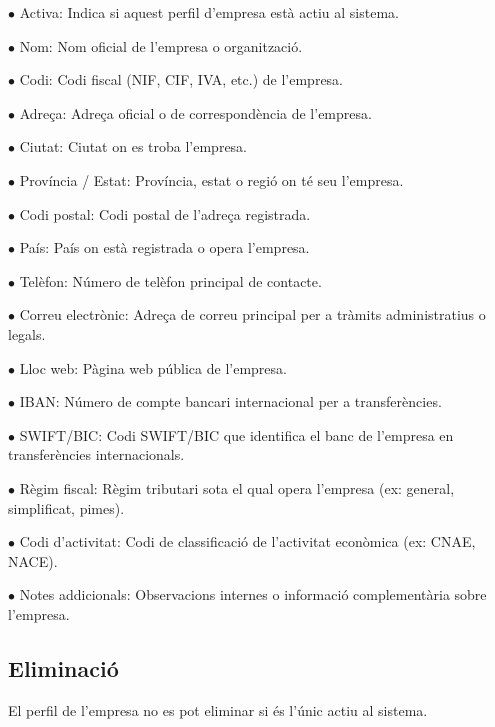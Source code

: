 \documentclass[a4paper]{article}
\begin{document}
\begin{compactitem}
\item[\color{myblue}$\bullet$] Activa: Indica si aquest perfil d'empresa està actiu al sistema.
\item[\color{myblue}$\bullet$] Nom: Nom oficial de l'empresa o organització.
\item[\color{myblue}$\bullet$] Codi: Codi fiscal (NIF, CIF, IVA, etc.) de l'empresa.
\item[\color{myblue}$\bullet$] Adreça: Adreça oficial o de correspondència de l'empresa.
\item[\color{myblue}$\bullet$] Ciutat: Ciutat on es troba l'empresa.
\item[\color{myblue}$\bullet$] Província / Estat: Província, estat o regió on té seu l'empresa.
\item[\color{myblue}$\bullet$] Codi postal: Codi postal de l'adreça registrada.
\item[\color{myblue}$\bullet$] País: País on està registrada o opera l'empresa.
\item[\color{myblue}$\bullet$] Telèfon: Número de telèfon principal de contacte.
\item[\color{myblue}$\bullet$] Correu electrònic: Adreça de correu principal per a tràmits administratius o legals.
\item[\color{myblue}$\bullet$] Lloc web: Pàgina web pública de l'empresa.
\item[\color{myblue}$\bullet$] IBAN: Número de compte bancari internacional per a transferències.
\item[\color{myblue}$\bullet$] SWIFT/BIC: Codi SWIFT/BIC que identifica el banc de l'empresa en transferències internacionals.
\item[\color{myblue}$\bullet$] Règim fiscal: Règim tributari sota el qual opera l'empresa (ex: general, simplificat, pimes).
\item[\color{myblue}$\bullet$] Codi d'activitat: Codi de classificació de l'activitat econòmica (ex: CNAE, NACE).
\item[\color{myblue}$\bullet$] Notes addicionals: Observacions internes o informació complementària sobre l'empresa.
\end{compactitem}

\hypertarget{toc45}{}
\subsection{Eliminació}

El perfil de l'empresa no es pot eliminar si és l'únic actiu al sistema.
\end{document}
